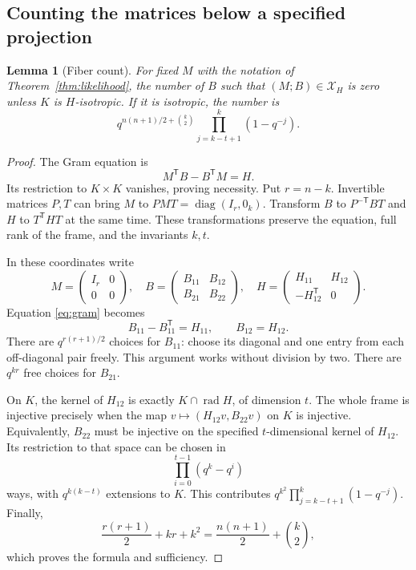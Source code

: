 \documentclass[11pt]{article}
\newcommand{\rad}{\operatorname{rad}}
\newcommand{\1}{\mathbf 1}
\newtheorem{lemma}[theorem]{Lemma}
\theoremstyle{definition}
\theoremstyle{remark}
\numberwithin{equation}{section}
\begin{document}
\subsection{Counting the matrices below a specified projection}
\begin{lemma}[Fiber count]\label{lem:fiber}
For fixed $M$ with the notation of Theorem~\ref{thm:likelihood}, the number of $B$ such that $(M;B)\in\mathcal X_H$ is zero unless $K$ is $H$-isotropic. If it is isotropic, the number is
\begin{equation}\label{eq:fiber}
q^{n(n+1)/2+\binom{k}{2}}
\prod_{j=k-t+1}^{k}(1-q^{-j}).
\end{equation}
\end{lemma}
\begin{proof}
The Gram equation is
\begin{equation}\label{eq:gram}
M^{\mathsf T}B-B^{\mathsf T}M=H.
\end{equation}
Its restriction to $K\times K$ vanishes, proving necessity. Put $r=n-k$. Invertible matrices $P,T$ can bring $M$ to $PMT=\operatorname{diag}(I_r,0_k)$. Transform $B$ to $P^{-\mathsf T}BT$ and $H$ to $T^{\mathsf T}HT$ at the same time. These transformations preserve the equation, full rank of the frame, and the invariants $k,t$.

In these coordinates write
\[
M=\begin{pmatrix}I_r&0\\0&0\end{pmatrix},\quad
B=\begin{pmatrix}B_{11}&B_{12}\\B_{21}&B_{22}\end{pmatrix},\quad
H=\begin{pmatrix}H_{11}&H_{12}\\-H_{12}^{\mathsf T}&0\end{pmatrix}.
\]
Equation \eqref{eq:gram} becomes
\[
B_{11}-B_{11}^{\mathsf T}=H_{11},\qquad B_{12}=H_{12}.
\]
There are $q^{r(r+1)/2}$ choices for $B_{11}$: choose its diagonal and one entry from each off-diagonal pair freely. This argument works without division by two. There are $q^{kr}$ free choices for $B_{21}$.

On $K$, the kernel of $H_{12}$ is exactly $K\cap\rad H$, of dimension $t$. The whole frame is injective precisely when the map
$v\mapsto(H_{12}v,B_{22}v)$ on $K$ is injective. Equivalently, $B_{22}$ must be injective on the specified $t$-dimensional kernel of $H_{12}$. Its restriction to that space can be chosen in
\[
\prod_{i=0}^{t-1}(q^k-q^i)
\]
ways, with $q^{k(k-t)}$ extensions to $K$. This contributes
$q^{k^2}\prod_{j=k-t+1}^{k}(1-q^{-j})$. Finally,
\[
\frac{r(r+1)}2+kr+k^2=\frac{n(n+1)}2+\binom{k}{2},
\]
which proves the formula and sufficiency.
\end{proof}
\end{document}
